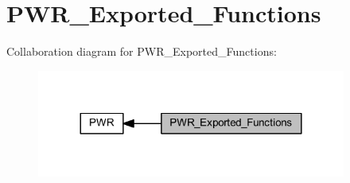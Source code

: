 \hypertarget{group___p_w_r___exported___functions}{}\section{P\+W\+R\+\_\+\+Exported\+\_\+\+Functions}
\label{group___p_w_r___exported___functions}
Collaboration diagram for P\+W\+R\+\_\+\+Exported\+\_\+\+Functions\+:
\nopagebreak
\begin{figure}[H]
\begin{center}
\leavevmode
\includegraphics[width=288pt]{group___p_w_r___exported___functions}
\end{center}
\end{figure}
